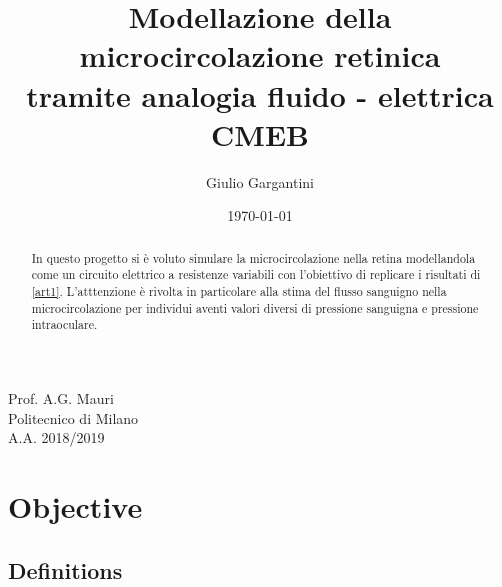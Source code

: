 \documentclass{article}
\title{Modellazione della microcircolazione retinica\\tramite analogia fluido - elettrica \\ CMEB} %
\author{Giulio Gargantini} %
\date{\today} %
\begin{document}
\maketitle %

\begin{center}
Prof. A.G. Mauri \\
Politecnico di Milano\\
A.A. 2018/2019
\end{center}

\begin{abstract}
In questo progetto si è voluto simulare la microcircolazione nella retina modellandola come un circuito elettrico a resistenze variabili con l'obiettivo di replicare i risultati di \ref{art1}. L'atttenzione è rivolta in particolare alla stima del flusso sanguigno nella microcircolazione per individui aventi valori diversi di pressione sanguigna e pressione intraoculare.
\end{abstract}


\section{Objective}



\subsection{Definitions}


%





\end{document}
